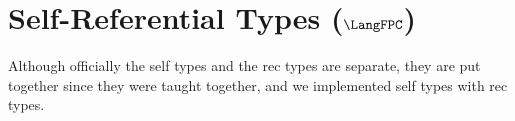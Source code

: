 \section{Self-Referential Types ($\LangFPC$)}

Although officially the self types and the rec types are separate, they are
put together since they were taught together, and we implemented self types
with rec types.






